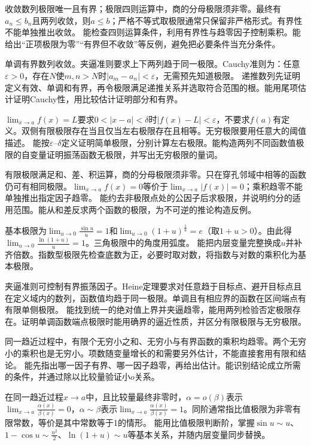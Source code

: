 {收敛数列极限唯一且有界；极限四则运算中，商的分母极限须非零。最终有$a_n\le b_n$且两列收敛，则$a\le b$；严格不等式取极限通常只保留非严格形式。有界性不能单独推出收敛。}
{能检查四则运算条件，利用有界性与趋零因子控制乘积。能给出“正项极限为零”“有界但不收敛”等反例，避免把必要条件当充分条件。}

{单调有界数列收敛。夹逼准则要求上下两列趋于同一极限。Cauchy准则为：任意$\varepsilon>0$，存在$N$使$m,n>N$时$|a_m-a_n|<\varepsilon$，无需预先知道极限。}
{递推数列先证明定义有效、单调和有界，再令极限满足递推关系并选取符合范围的根。能用尾项估计证明Cauchy性，用比较估计证明部分和有界。}

{$\lim_{x\to a}f(x)=L$要求$0<|x-a|<\delta$时$|f(x)-L|<\varepsilon$，不要求$f(a)$有定义。双侧有限极限存在当且仅当左右极限存在且相等。无穷极限要用任意大的阈值描述。}
{能按$\varepsilon$--$\delta$定义证明简单极限，分别计算左右极限。能构造两列不同函数值极限的自变量证明振荡函数无极限，并写出无穷极限的量词。}

{有限极限满足和、差、积运算，商的分母极限须非零。只在穿孔邻域中相等的函数仍可有相同极限。$\lim_{x\to a}f(x)=0$等价于$\lim_{x\to a}|f(x)|=0$；乘积趋零不能单独推出指定因子趋零。}
{能约去非极限点处的公因子后求极限，并说明约分的适用范围。能从和差反求两个函数的极限，为不可逆的推论构造反例。}

{基本极限为$\lim_{u\to0}\frac{\sin u}{u}=1$和$\lim_{u\to0}(1+u)^{\frac1u}=e$（取$1+u>0$）。由此得$\lim_{u\to0}\frac{\ln(1+u)}{u}=1$。三角极限中的角度用弧度。}
{能把内层变量完整换成$u$并补齐倍数。指数型极限先检查底数为正，必要时取对数，将指数与对数的乘积化为基本极限。}

{夹逼准则可控制有界振荡因子。Heine定理要求对任意趋于目标点、避开目标点且在定义域内的数列，函数值均趋于同一极限。单调且有相应界的函数在区间端点有有限单侧极限。}
{能找到统一的绝对值上界并夹逼趋零，能用两列检验否定极限存在。证明单调函数端点极限时能用确界的逼近性质，并区分有限极限与无穷极限。}

{同一趋近过程中，有限个无穷小之和、无穷小与有界函数的乘积均趋零。两个无穷小的乘积也是无穷小。项数随变量增长的和需要另外估计，不能直接套用有限和结论。}
{能先指出哪一因子有界、哪一因子趋零，再给出估计。能识别结论成立所需的条件，并通过除以比较量验证小$o$关系。}

{在同一趋近过程$x\to a$中，且比较量最终非零时，$\alpha=o(\beta)$表示$\lim_{x\to a}\frac{\alpha(x)}{\beta(x)}=0$，$\alpha\sim\beta$表示$\lim_{x\to a}\frac{\alpha(x)}{\beta(x)}=1$。同阶通常指比值极限为非零有限常数，等价是其中常数等于1的情形。}
{能用比值极限判断阶，掌握$\sin u\sim u$、$1-\cos u\sim\frac{u^2}{2}$、$\ln(1+u)\sim u$等基本关系，并随内层变量同步替换。}

